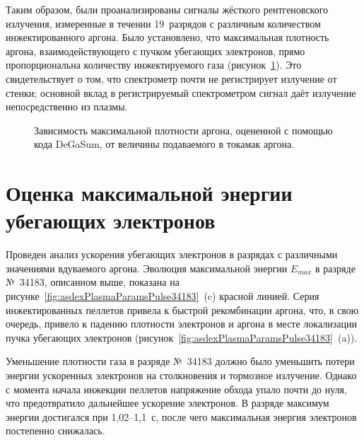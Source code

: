 Таким образом, были проанализированы сигналы жёсткого рентгеновского излучения, измеренные в течении 19~разрядов с различным количеством инжектированного аргона. Было установлено, что максимальная плотность аргона, взаимодействующего с пучком убегающих электронов, прямо пропорциональна количеству инжектируемого газа (рисунок~\ref{fig:asdexArgonDensityVsHxr}). Это свидетельствует о том, что спектрометр почти не регистрирует излучение от стенки; основной вклад в регистрируемый спектрометром сигнал даёт излучение непосредственно из плазмы.~\cite{Shevelev2021}

\begin{figure}[ht!]
  \caption{ Зависимость максимальной плотности аргона, оцененной с помощью кода DeGaSum, от величины подаваемого в токамак аргона.~\cite{Shevelev2021} }
  \label{fig:asdexArgonDensityVsHxr}
\end{figure}



\section{Оценка максимальной энергии убегающих электронов}

Проведен анализ ускорения убегающих электронов в разрядах с различными значениями вдуваемого аргона. Эволюция максимальной энергии $E_{max}$ в разряде №~34183, описанном выше, показана на рисунке~\ref{fig:asdexPlasmaParamsPulse34183}~(c) красной линией. Серия инжектированных пеллетов привела к быстрой рекомбинации аргона, что, в свою очередь, привело к падению плотности электронов и аргона в месте локализации пучка убегающих электронов (рисунок~\ref{fig:asdexPlasmaParamsPulse34183}~(a)).

Уменьшение плотности газа в разряде №~34183 должно было уменьшить потери энергии ускоренных электронов на столкновения и тормозное излучение. Однако с момента начала инжекции пеллетов напряжение обхода упало почти до нуля, что предотвратило дальнейшее ускорение электронов. В разряде максимум энергии достигался при 1,02--1,1~с, после чего максимальная энергия электронов постепенно снижалась. 

